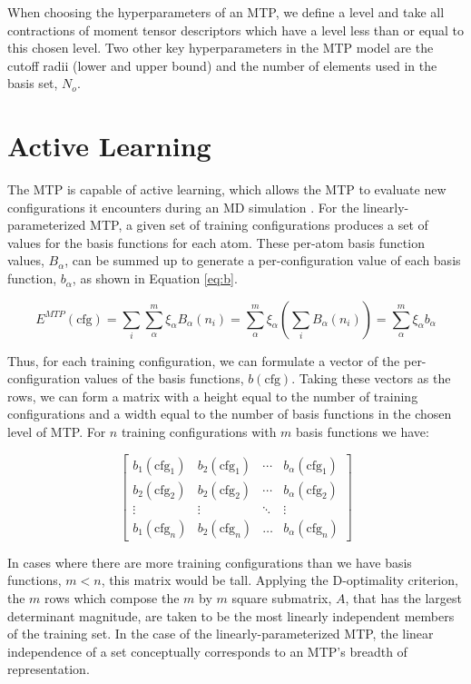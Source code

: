 \documentclass[9pt,twocolumn,twoside]{opticajnl}
\begin{document}
When choosing the hyperparameters of an MTP, we define a level and take all contractions of moment tensor descriptors which have a level less than or equal to this chosen level. Two other key hyperparameters in the MTP model are the cutoff radii (lower and upper bound) and the number of elements used in the basis set, $N_o$.

\section{Active Learning}
The MTP is capable of active learning, which allows the MTP to evaluate new configurations it encounters during an MD simulation \cite{mlip}. For the linearly-parameterized MTP, a given set of training configurations produces a set of values for the basis functions for each atom. These per-atom basis function values, $B_\alpha$, can be summed up to generate a per-configuration value of each basis function, $b_\alpha$, as shown in Equation \ref{eq:b}.

\begin{equation} \label{eq:b}
  E^{MTP}(\textrm{cfg}) = \sum_i \sum_\alpha^m \xi_\alpha B_\alpha (n_i) = \sum_\alpha^m \xi_\alpha (\sum_i  B_\alpha (n_i)) = \sum_\alpha^m \xi_\alpha b_\alpha
\end{equation}

Thus, for each training configuration, we can formulate a vector of the per-configuration values of the basis functions, $b(\textrm{cfg})$. Taking these vectors as the rows, we can form a matrix with a height equal to the number of training configurations and a width equal to the number of basis functions in the chosen level of MTP.  For $n$ training configurations with $m$ basis functions we have:

\[
\begin{bmatrix} 
    b_{1}(\textrm{cfg}_1)  & b_{2}(\textrm{cfg}_1)  & \cdots & b_{\alpha}(\textrm{cfg}_1) \\
    b_{2}(\textrm{cfg}_2)  & b_{2}(\textrm{cfg}_2)  & \cdots & b_{\alpha}(\textrm{cfg}_2) \\
    \vdots & \vdots & \ddots & \vdots \\ 
    b_{1}(\textrm{cfg}_n)       & b_{2}(\textrm{cfg}_n)  & \dots & b_{\alpha}(\textrm{cfg}_n) 
\end{bmatrix}
\]


In cases where there are more training configurations than we have basis functions, $m < n$, this matrix would be tall. Applying the D-optimality criterion, the $m$ rows which compose the $m$ by $m$ square submatrix, $A$, that has the largest determinant magnitude, are taken to be the most linearly independent members of the training set. In the case of the linearly-parameterized MTP, the linear independence of a set conceptually corresponds to an MTP's breadth of representation.
\end{document}

